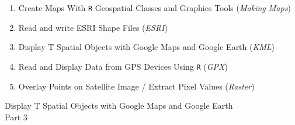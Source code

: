 \documentclass{beamer}
\begin{document}
\begin{frame}
\Large
\begin{enumerate}
\item Create Maps With \texttt{R} Geospatial Classes and Graphics Tools (\textit{Making Maps})
\item Read and write ESRI Shape Files (\textit{ESRI})
\item Display T Spatial Objects with Google Maps and Google Earth (\textit{KML})
\item Read and Display Data from GPS Devices Using \texttt{R} (\textit{GPX})
\item Overlay Points on Satellite Image / Extract Pixel Values (\textit{Raster})
\end{enumerate}
\end{frame}

\begin{frame}
\huge
Display T Spatial Objects with Google Maps and Google Earth
\\ Part 3
\end{frame}
\end{document}
